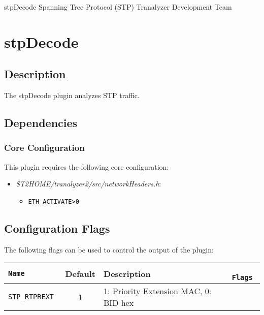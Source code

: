 \documentclass[documentation]{subfiles}
\begin{document}
\trantitle
    {stpDecode} %
    {Spanning Tree Protocol (STP)} %
    {Tranalyzer Development Team} %

\section{stpDecode}\label{s:stpDecode}

\subsection{Description}
The stpDecode plugin analyzes STP traffic.

\subsection{Dependencies}

\subsubsection{Core Configuration}
This plugin requires the following core configuration:
\begin{itemize}
    \item {\em \$T2HOME/tranalyzer2/src/networkHeaders.h}:
        \begin{itemize}
            \item {\tt ETH\_ACTIVATE>0}
        \end{itemize}
\end{itemize}

\subsection{Configuration Flags}
The following flags can be used to control the output of the plugin:
\begin{longtable}{>{\tt}lcl>{\tt\small}l}
    \toprule
    {\bf Name} & {\bf Default} & {\bf Description} & {\bf Flags}\\
    \midrule\endhead%
    STP\_RTPREXT & 1 & 1: Priority Extension MAC, 0: BID hex & \\
    \bottomrule
\end{longtable}
\end{document}
